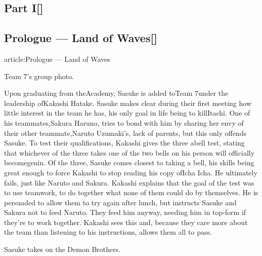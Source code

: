 \documentclass[a4paper,12pt]{article}
\begin{document}
\subsection*{Part I[]}\n\n\subsection*{Prologue — Land of Waves[]}\n\nMain article:Prologue — Land of Waves\\ \par \vspace{0.5cm}

Team 7's group photo.\\ \par \vspace{0.5cm}

Upon graduating from theAcademy, Sasuke is added toTeam 7under the leadership ofKakashi Hatake. Sasuke makes clear during their first meeting how little interest in the team he has, his only goal in life being to killItachi. One of his teammates,Sakura Haruno, tries to bond with him by sharing her envy of their other teammate,Naruto Uzumaki's, lack of parents, but this only offends Sasuke. To test their qualifications, Kakashi gives the three abell test, stating that whichever of the three takes one of the two bells on his person will officially becomegenin. Of the three, Sasuke comes closest to taking a bell, his skills being great enough to force Kakashi to stop reading his copy ofIcha Icha. He ultimately fails, just like Naruto and Sakura. Kakashi explains that the goal of the test was to use teamwork, to do together what none of them could do by themselves. He is persuaded to allow them to try again after lunch, but instructs Sasuke and Sakura not to feed Naruto. They feed him anyway, needing him in top-form if they're to work together. Kakashi sees this and, because they care more about the team than listening to his instructions, allows them all to pass.\\ \par \vspace{0.5cm}

Sasuke takes on the Demon Brothers.\\ \par \vspace{0.5cm}
\end{document}
